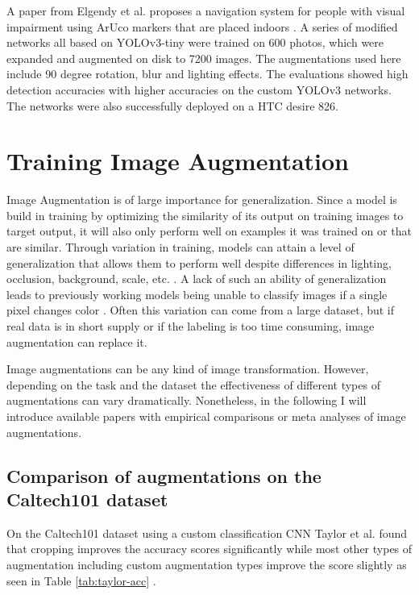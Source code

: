 \documentclass[10pt]{book}
\begin{document}
A paper from Elgendy et al. proposes a navigation system for people with visual impairment using \ac{ArUco} markers that are placed indoors \cite{elgendy2021novel}. A series of modified networks all based on \ac{YOLO}v3-tiny were trained on 600 photos, which were expanded and augmented on disk to 7200 images. The augmentations used here include 90 degree rotation, blur and lighting effects. The evaluations showed high detection accuracies with higher accuracies on the custom \ac{YOLO}v3 networks. The networks were also successfully deployed on a HTC desire 826.

\section{Training Image Augmentation}

Image Augmentation is of large importance for generalization. Since a model is build in training by optimizing the similarity of its output on training images to target output, it will also only perform well on examples it was trained on or that are similar. Through variation in training, models can attain a level of generalization that allows them to perform well despite differences in lighting, occlusion, background, scale, etc. \cite{shorten2019survey}. A lack of such an ability of generalization leads to previously working models being unable to classify images if a single pixel changes color \cite{8601309}. Often this variation can come from a large dataset, but if real data is in short supply or if the labeling is too time consuming, image augmentation can replace it.

Image augmentations can be any kind of image transformation. However, depending on the task and the dataset the effectiveness of different types of augmentations can vary dramatically. Nonetheless, in the following I will introduce available papers with empirical comparisons or meta analyses of image augmentations.

\subsection{Comparison of augmentations on the Caltech101 dataset}

On the Caltech101 dataset using a custom classification \ac{CNN} Taylor et al. found that cropping improves the accuracy scores significantly while most other types of augmentation including custom augmentation types improve the score slightly as seen in Table \ref{tab:taylor-acc} \cite{8628742}.
\end{document}
